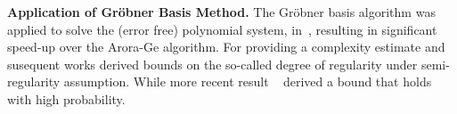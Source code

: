 \noindent
\textbf{Application of Gr{\"o}bner Basis Method.}
The Gr{\"o}bner basis algorithm was applied %
to solve the (error free) polynomial system, in~\cite{EPRINT:ACFP14}, resulting in significant speed-up over the Arora-Ge algorithm. For providing a
complexity estimate \cite{EPRINT:ACFP14} and susequent works \cite{ACISP:SunTibAbe20, EPRINT:Steiner24b} derived bounds on the so-called degree of regularity under semi-regularity assumption. While more recent result ~\cite{EC:NMSU25} derived a bound that holds with high probability.  




